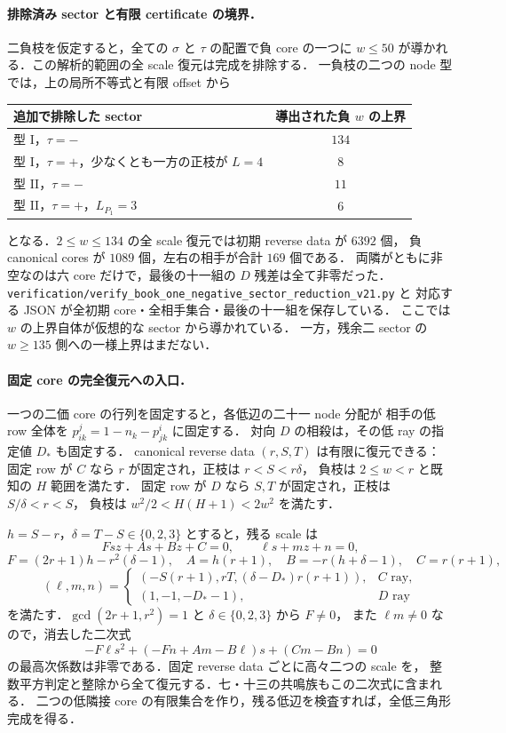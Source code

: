 \paragraph{排除済み sector と有限 certificate の境界．}
二負枝を仮定すると，全ての $\sigma$ と $\tau$ の配置で負 core の一つに
$w\le50$ が導かれる．この解析的範囲の全 scale 復元は完成を排除する．
一負枝の二つの node 型では，上の局所不等式と有限 offset から
\begin{center}
\begin{tabular}{lc}
追加で排除した sector & 導出された負 $w$ の上界\\\hline
型 I，$\tau=-$ & $134$\\
型 I，$\tau=+$，少なくとも一方の正枝が $L=4$ & $8$\\
型 II，$\tau=-$ & $11$\\
型 II，$\tau=+$，$L_{P_1}=3$ & $6$
\end{tabular}
\end{center}
となる．$2\le w\le134$ の全 scale 復元では初期 reverse data が $6392$ 個，
負 canonical cores が $1089$ 個，左右の相手が合計 $169$ 個である．
両隣がともに非空なのは六 core だけで，最後の十一組の $D$ 残差は全て非零だった．
\nolinkurl{verification/verify_book_one_negative_sector_reduction_v21.py} と
対応する JSON が全初期 core・全相手集合・最後の十一組を保存している．
ここでは $w$ の上界自体が仮想的な sector から導かれている．
一方，残余二 sector の $w\ge135$ 側への一様上界はまだない．

\paragraph{固定 core の完全復元への入口．}
一つの二価 core の行列を固定すると，各低辺の二十一 node 分配が
相手の低 row 全体を $p^j_{ik}=1-n_k-p^i_{jk}$ に固定する．
対向 $D$ の相殺は，その低 ray の指定値 $D_*$ も固定する．
canonical reverse data $(r,S,T)$ は有限に復元できる：
固定 row が $C$ なら $r$ が固定され，正枝は $r<S<r\delta$，
負枝は $2\le w<r$ と既知の $H$ 範囲を満たす．
固定 row が $D$ なら $S,T$ が固定され，正枝は $S/\delta<r<S$，
負枝は $w^2/2<H(H+1)<2w^2$ を満たす．

$h=S-r$，$\delta=T-S\in\{0,2,3\}$ とすると，残る scale は
\[
 Fsz+As+Bz+C=0,\qquad \ell s+mz+n=0,
\]
\[
 F=(2r+1)h-r^2(\delta-1),\quad
 A=h(r+1),\quad B=-r(h+\delta-1),\quad C=r(r+1),
\]
\[
 (\ell,m,n)=
 \begin{cases}
 (-S(r+1),rT,(\delta-D_*)r(r+1)),&C\text{ ray},\\
 (1,-1,-D_*-1),&D\text{ ray}
 \end{cases}
\]
を満たす．$\gcd(2r+1,r^2)=1$ と $\delta\in\{0,2,3\}$ から $F\ne0$，
また $\ell m\ne0$ なので，消去した二次式
\[
 -F\ell s^2+(-Fn+Am-B\ell)s+(Cm-Bn)=0
\]
の最高次係数は非零である．固定 reverse data ごとに高々二つの scale を，
整数平方判定と整除から全て復元する．七・十三の共鳴族もこの二次式に含まれる．
二つの低隣接 core の有限集合を作り，残る低辺を検査すれば，全低三角形完成を得る．

